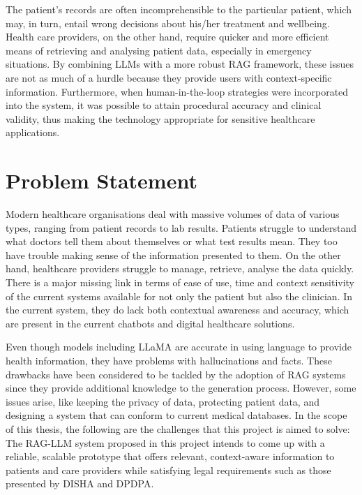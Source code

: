 The patient's records are often incomprehensible to the particular patient, which may, in turn, entail wrong decisions about his/her treatment and wellbeing. Health care providers, on the other hand, require quicker and more efficient means of retrieving and analysing patient data, especially in emergency situations. By combining LLMs with a more robust RAG framework, these issues are not as much of a hurdle because they provide users with context-specific information. Furthermore, when human-in-the-loop strategies were incorporated into the system, it was possible to attain procedural accuracy and clinical validity, thus making the technology appropriate for sensitive healthcare applications.

\newpage

\section{Problem Statement}
Modern healthcare organisations deal with massive volumes of data of various types, ranging from patient records to lab results. Patients struggle to understand what doctors tell them about themselves or what test results mean. They too have trouble making sense of the information presented to them. On the other hand, healthcare providers struggle to manage, retrieve, analyse the data quickly. There is a major missing link in terms of ease of use, time and context sensitivity of the current systems available for not only the patient but also the clinician. In the current system, they do lack both contextual awareness and accuracy, which are present in the current chatbots and digital healthcare solutions.

Even though models including LLaMA are accurate in using language to provide health information, they have problems with hallucinations and facts. These drawbacks have been considered to be tackled by the adoption of RAG systems since they provide additional knowledge to the generation process. However, some issues arise, like keeping the privacy of data, protecting patient data, and designing a system that can conform to current medical databases. In the scope of this thesis, the following are the challenges that this project is aimed to solve: The RAG-LLM system proposed in this project intends to come up with a reliable, scalable prototype that offers relevant, context-aware information to patients and care providers while satisfying legal requirements such as those presented by DISHA\cite{Ganapathy} and DPDPA\cite{SundaraNarendran+2023+129+141}.